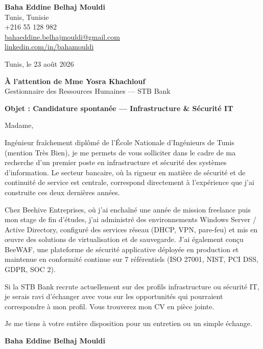 \documentclass[a4paper,11pt]{article}
\begin{document}
\begin{flushright}
{\bfseries Baha Eddine Belhaj Mouldi}\\
Tunis, Tunisie\\
+216 55 128 982\\
\href{mailto:bahaeddine.belhajmouldi@gmail.com}{bahaeddine.belhajmouldi@gmail.com}\\
\href{https://linkedin.com/in/bahamouldi}{linkedin.com/in/bahamouldi}
\end{flushright}
\vspace{0.8cm}
\begin{flushleft}
Tunis, le 23 ao\^ut 2026
\vspace{0.8cm}

{\bfseries \`A l'attention de Mme Yosra Khachlouf}\\
Gestionnaire des Ressources Humaines --- STB Bank
\vspace{0.6cm}

{\bfseries Objet : Candidature spontan\'ee --- Infrastructure \& S\'ecurit\'e IT}
\end{flushleft}
\vspace{0.6cm}
Madame,

Ing\'enieur fra\^ichement dipl\^om\'e de l'\'Ecole Nationale d'Ing\'enieurs de Tunis (mention Tr\`es Bien), je me permets de vous solliciter dans le cadre de ma recherche d'un premier poste en infrastructure et s\'ecurit\'e des syst\`emes d'information. Le secteur bancaire, o\`u la rigueur en mati\`ere de s\'ecurit\'e et de continuit\'e de service est centrale, correspond directement \`a l'exp\'erience que j'ai construite ces deux derni\`eres ann\'ees.

Chez Beehive Entreprises, o\`u j'ai encha\^in\'e une ann\'ee de mission freelance puis mon stage de fin d'\'etudes, j'ai administr\'e des environnements Windows Server / Active Directory, configur\'e des services r\'eseau (DHCP, VPN, pare-feu) et mis en \oe uvre des solutions de virtualisation et de sauvegarde. J'ai \'egalement con\c cu BeeWAF, une plateforme de s\'ecurit\'e applicative d\'eploy\'ee en production et maintenue en conformit\'e continue sur 7 r\'ef\'erentiels (ISO 27001, NIST, PCI DSS, GDPR, SOC 2).

Si la STB Bank recrute actuellement sur des profils infrastructure ou s\'ecurit\'e IT, je serais ravi d'\'echanger avec vous sur les opportunit\'es qui pourraient correspondre \`a mon profil. Vous trouverez mon CV en pi\`ece jointe.

Je me tiens \`a votre enti\`ere disposition pour un entretien ou un simple \'echange.

\vspace{0.8cm}
\begin{flushright}
{\bfseries Baha Eddine Belhaj Mouldi}
\end{flushright}
\end{document}
